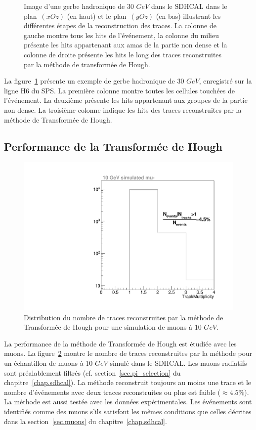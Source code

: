 \begin{figure}[!ht]
  \caption{Image d'une gerbe hadronique de 30 $GeV$ dans le SDHCAL dans le plan~$(xOz)$ (en haut) et le plan~$(yOz)$ (en bas) illustrant les différentes étapes de la reconstruction des traces. La colonne de gauche montre tous les hits de l'événement, la colonne du milieu présente les hits appartenant aux amas de la partie non dense et la colonne de droite présente les hits le long des traces reconstruites par la méthode de transformée de Hough.\label{fig.pi-_hough}}
\end{figure}
La figure~\ref{fig.pi-_hough} présente un exemple de gerbe hadronique de 30 $GeV$, enregistré sur la ligne H6 du SPS. La première colonne montre toutes les cellules touchées de l'événement. La deuxième présente les hits appartenant aux groupes de la partie non dense. La troisième colonne indique les hits des traces reconstruites par la méthode de Transformée de Hough. 
\newpage
\subsection{Performance de la Transformée de Hough}
\begin{figure}[!ht]
  \centering
  \includegraphics[width=.5\textwidth]{Shower/figs/ntrack_mu-_10GeV_ftfp_bert_hp.pdf}
  \caption{Distribution du nombre de traces reconstruites par la méthode de Transformée de Hough pour une simulation de muons à 10 $GeV$.\label{fig.ntrack_mu-_sim}}
\end{figure}
La performance de la méthode de Transformée de Hough est étudiée avec les muons. La figure~\ref{fig.ntrack_mu-_sim} montre le nombre de traces reconstruites par la méthode pour un échantillon de muons à 10 $GeV$ simulé dans le SDHCAL. Les muons radiatifs sont préalablement filtrés (cf. section~\ref{sec.pi_selection} du chapitre~\ref{chap.sdhcal}). La méthode reconstruit toujours au moins une trace et le nombre d'événements avec deux traces reconstruites ou plus est faible ($\approx 4.5\%$). La méthode est aussi testée avec les données expérimentales. Les événements sont identifiés comme des muons s'ils satisfont les mêmes conditions que celles décrites dans la section~\ref{sec.muons} du chapitre~\ref{chap.sdhcal}.

